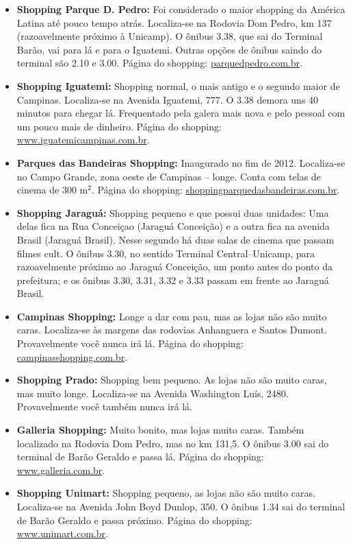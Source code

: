 \begin{itemize}

\item  \textbf{Shopping Parque D. Pedro:} Foi considerado o maior shopping da
    América Latina até pouco tempo atrás. Localiza-se na Rodovia Dom Pedro, km
    137 (razoavelmente próximo à Unicamp). O ônibus 3.38, que sai do Terminal
    Barão, vai para lá e para o Iguatemi. Outras opções de ônibus saindo do
    terminal são 2.10 e 3.00. Página do shopping: \url{parquedpedro.com.br}.

\item  \textbf{Shopping Iguatemi:} Shopping normal, o mais antigo e o segundo
    maior de Campinas. Localiza-se na Avenida Iguatemi, 777. O 3.38 demora uns
    40 minutos para chegar lá. Frequentado pela galera mais nova e pelo pessoal
    com um pouco mais de dinheiro. Página do shopping:
    \url{www.iguatemicampinas.com.br}.

\item \textbf{Parques das Bandeiras Shopping:} Inaugurado no fim de 2012.
    Localiza-se no Campo Grande, zona oeste de Campinas -- longe. Conta com
    telas de cinema de 300 m$^{2}$. Página do shopping:
    \url{shoppingparquedasbandeiras.com.br}.

\item  \textbf{Shopping Jaraguá:} Shopping pequeno e que possui duas unidades:
    Uma delas fica na Rua Conceiçao (Jaraguá Conceição) e a outra fica na
    avenida Brasil (Jaraguá Brasil). Nesse segundo há duas salas de cinema que
    passam filmes cult. O ônibus 3.30, no sentido Terminal Central--Unicamp,
    para razoavelmente próximo ao Jaraguá Conceição, um ponto antes do ponto da
    prefeitura; e os ônibus 3.30, 3.31, 3.32 e 3.33 passam em frente ao Jaraguá
    Brasil.

\item  \textbf{Campinas Shopping:} Longe a dar com pau, mas as lojas não são
    muito caras. Localiza-se às margens das rodovias Anhanguera e Santos Dumont.
    Provavelmente você nunca irá lá. Página do shopping:
    \url{campinasshopping.com.br}.

\item  \textbf{Shopping Prado:} Shopping bem pequeno. As lojas não são muito
    caras, mas muito longe. Localiza-se na Avenida Washington Luís, 2480.
    Provavelmente você também nunca irá lá.

\item  \textbf{Galleria Shopping:} Muito bonito, mas lojas muito caras. Também
    localizado na Rodovia Dom Pedro, mas no km 131,5. O ônibus 3.00 sai do
    terminal de Barão Geraldo e passa lá. Página do shopping:
    \url{www.galleria.com.br}.

\item  \textbf{Shopping Unimart:} Shopping pequeno, as lojas não são muito
    caras. Localiza-se na Avenida John Boyd Dunlop, 350. O ônibus 1.34 sai do
    terminal de Barão Geraldo e passa próximo. Página do shopping:
    \url{www.unimart.com.br}.

\end{itemize}